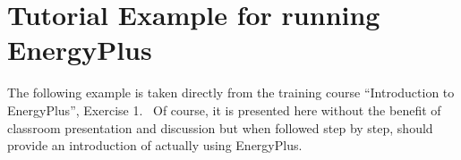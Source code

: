 \chapter{Tutorial Example for running EnergyPlus}\label{tutorial-example-for-running-energyplus}

The following example is taken directly from the training course ``Introduction to EnergyPlus'', Exercise 1.~ Of course, it is presented here without the benefit of classroom presentation and discussion but when followed step by step, should provide an introduction of actually using EnergyPlus.
